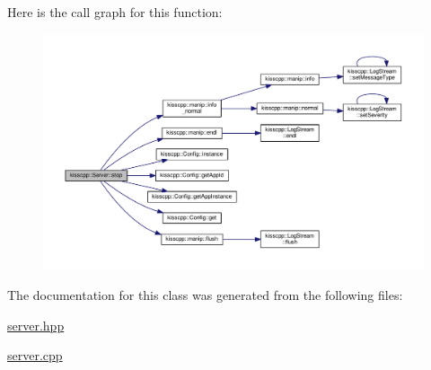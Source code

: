 Here is the call graph for this function\-:\nopagebreak
\begin{figure}[H]
\begin{center}
\leavevmode
\includegraphics[width=350pt]{classkisscpp_1_1_server_aba167cdf551f3b29937c923ad7d18964_cgraph}
\end{center}
\end{figure}




The documentation for this class was generated from the following files\-:\begin{DoxyCompactItemize}
\item 
\hyperlink{server_8hpp}{server.\-hpp}\item 
\hyperlink{server_8cpp}{server.\-cpp}\end{DoxyCompactItemize}

